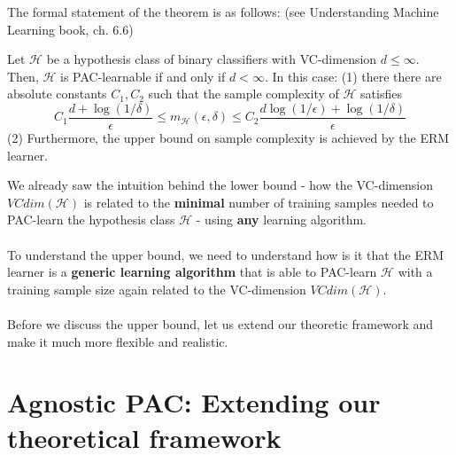\documentclass[11pt]{article}
\newcommand{\Hc}{\mathcal{H}}
\begin{document}
The formal statement of the theorem is as follows: (see   Understanding Machine Learning book, ch. 6.6)
	

  \begin{theorem} 
    Let $\Hc$ be a hypothesis class of
    binary classifiers with VC-dimension $d\leq \infty$. 
    Then, $\Hc$ is PAC-learnable if and only if $d<\infty$. In this case: (1) there
    there are absolute constants $C_1,C_2$
    such that the sample complexity of $\Hc$ satisfies \[ C_1
    \frac{d + \log(1/\delta)}{\epsilon} \le m_\Hc(\epsilon,\delta) \le
    C_2 \frac{d \log(1/\epsilon) + \log(1/\delta)}{\epsilon} \]
(2) Furthermore, the upper bound on sample complexity is achieved by the ERM learner.
  \end{theorem}

  We already saw the intuition behind the lower bound - how the VC-dimension
  $VCdim(\Hc)$ is related to the {\bf minimal} number of training samples needed
  to PAC-learn the hypothesis class $\Hc$ - using {\bf any} learning algorithm.
\\~\\
To understand the upper bound, we need to understand 
how is it that the ERM learner is a {\bf generic
learning algorithm} that is able to PAC-learn $\Hc$ with a training sample size
again related to the VC-dimension $VCdim(\Hc)$.
\\~\\
Before we discuss the upper bound, let us extend our theoretic framework and
make it much more flexible and realistic.



  \section{Agnostic PAC: Extending our theoretical framework}
\end{document}
